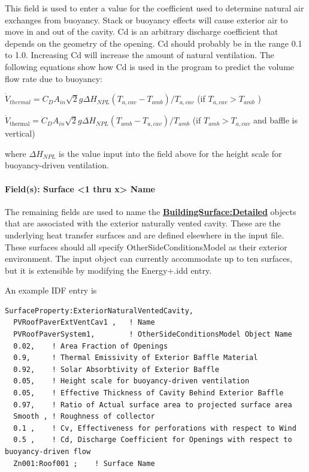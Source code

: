 This field is used to enter a value for the coefficient used to determine natural air exchanges from buoyancy. Stack or buoyancy effects will cause exterior air to move in and out of the cavity. Cd is an arbitrary discharge coefficient that depends on the geometry of the opening. Cd should probably be in the range 0.1 to 1.0. Increasing Cd will increase the amount of natural ventilation. The following equations show how Cd is used in the program to predict the volume flow rate due to buoyancy:

\(\dot{V}_{thermal} = C_D A_{in} \sqrt 2 g \Delta H_{NPL} \left( T_{a,cav} - T_{amb} \right) / T_{a,cav}\) (if \(T_{a,cav} > T_{amb}\) )

\(\dot{V}_{\text{thermal}} = C_D A_{in} \sqrt 2 g \Delta H_{NPL} \left( T_{amb} - T_{a,cav} \right) / T_{amb}\) (if \(T_{amb} > T_{a,cav}\) and baffle is vertical)

where \(\Delta {H_{NPL}}\) is the value input into the field above for the height scale for buoyancy-driven ventilation.

\paragraph{Field(s): Surface \textless{}1 thru x\textgreater{} Name}\label{fields-surface-1-thru-x-name}

The remaining fields are used to name the \textbf{\hyperref[buildingsurfacedetailed]{BuildingSurface:Detailed}} objects that are associated with the exterior naturally vented cavity. These are the underlying heat transfer surfaces and are defined elsewhere in the input file. These surfaces should all specify OtherSideConditionsModel as their exterior environment. The input object can currently accommodate up to ten surfaces, but it is extensible by modifying the Energy+.idd entry.

An example IDF entry is

\begin{lstlisting}
SurfaceProperty:ExteriorNaturalVentedCavity,
  PVRoofPaverExtVentCav1 ,   ! Name
  PVRoofPaverSystem1,        ! OtherSideConditionsModel Object Name
  0.02,    ! Area Fraction of Openings
  0.9,     ! Thermal Emissivity of Exterior Baffle Material
  0.92,    ! Solar Absorbtivity of Exterior Baffle
  0.05,    ! Height scale for buoyancy-driven ventilation
  0.05,    ! Effective Thickness of Cavity Behind Exterior Baffle
  0.97,    ! Ratio of Actual surface area to projected surface area
  Smooth , ! Roughness of collector
  0.1 ,    ! Cv, Effectiveness for perforations with respect to Wind
  0.5 ,    ! Cd, Discharge Coefficient for Openings with respect to buoyancy-driven flow
  Zn001:Roof001 ;    ! Surface Name
\end{lstlisting}

